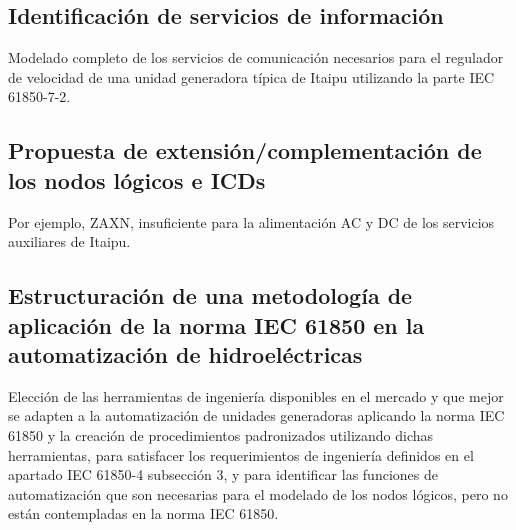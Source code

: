 	\subsection{Identificaci\'on de servicios de informaci\'on}
		Modelado completo de los servicios de comunicaci\'on necesarios para el
		regulador de velocidad de una unidad generadora t\'ipica de Itaipu
		utilizando la parte IEC 61850-7-2.
	\subsection{Propuesta de extensi\'on/complementaci\'on de los nodos l\'ogicos
		e ICDs} Por ejemplo, ZAXN, insuficiente para la alimentaci\'on AC y DC de los
		servicios auxiliares de Itaipu.
	\subsection{Estructuraci\'on de una metodolog\'ia de aplicaci\'on de la norma
		IEC 61850 en la automatizaci\'on de hidroel\'ectricas} Elecci\'on de las
		herramientas de ingenier\'ia disponibles en el mercado y que mejor se adapten
		a la automatizaci\'on de unidades generadoras aplicando la norma IEC 61850 y
		la creaci\'on de procedimientos padronizados utilizando dichas herramientas,
		para satisfacer los requerimientos de ingenier\'ia definidos en el apartado
		IEC 61850-4 subsecci\'on 3, y para identificar las funciones de
		automatizaci\'on que son necesarias para el modelado de los nodos l\'ogicos,
		pero no est\'an contempladas en la norma IEC 61850.
